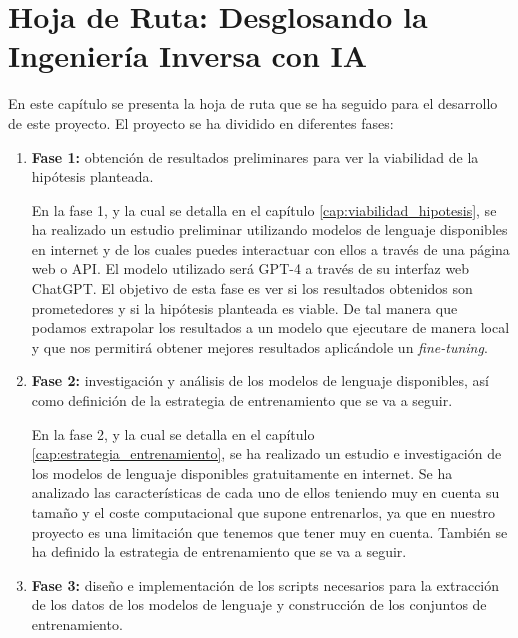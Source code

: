 \chapter{Hoja de Ruta: Desglosando la Ingeniería Inversa con IA}
\label{cap:hoja_de_ruta}


En este capítulo se presenta la hoja de ruta que se ha seguido para el desarrollo de
este proyecto. El proyecto se ha dividido en diferentes fases:

\begin{enumerate}
    \item \textbf{Fase 1:} obtención de resultados preliminares para ver la viabilidad 
        de la hipótesis planteada.

        En la fase 1, y la cual se detalla en el capítulo \ref{cap:viabilidad_hipotesis},
        se ha realizado un estudio preliminar utilizando modelos de lenguaje
        disponibles en internet y de los cuales puedes interactuar con ellos a través de
        una página web o API. El modelo utilizado será GPT-4 a través de su interfaz web
        ChatGPT. El objetivo de esta fase es ver si los resultados obtenidos son prometedores
        y si la hipótesis planteada es viable. De tal manera que podamos extrapolar los resultados
        a un modelo que ejecutare de manera local y que nos permitirá obtener mejores resultados
        aplicándole un \textit{fine-tuning}.

    \item \textbf{Fase 2:} investigación y análisis de los modelos de lenguaje disponibles,
        así como definición de la estrategia de entrenamiento que se va a seguir.
        
        En la fase 2, y la cual se detalla en el capítulo \ref{cap:estrategia_entrenamiento},
        se ha realizado un estudio e investigación de los modelos de lenguaje disponibles
        gratuitamente en internet. Se ha analizado las características de cada uno de ellos
        teniendo muy en cuenta su tamaño y el coste computacional que supone entrenarlos, ya que
        en nuestro proyecto es una limitación que tenemos que tener muy en cuenta. También se ha
        definido la estrategia de entrenamiento que se va a seguir.

    \item \textbf{Fase 3:} diseño e implementación de los scripts necesarios para la
        extracción de los datos de los modelos de lenguaje y construcción de los
        conjuntos de entrenamiento.
        

\end{enumerate}
